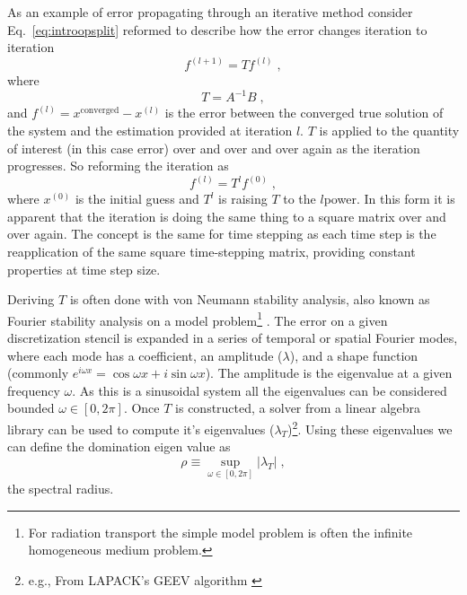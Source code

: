 As an example of error propagating through an iterative method consider Eq.~\eqref{eq:introopsplit} reformed to describe how the error changes iteration to iteration
\begin{equation}
    f^{(l+1)} = {T}f^{(l)} \; ,
\end{equation}
where
\begin{equation}
    {T} =   A^{-1}B \;,  %
\end{equation}
and $f^{(l)} = x^{\text{converged}} - x^{(l)}$ is the error between the converged true solution of the system and the estimation provided at iteration $l$.
${T}$ is applied to the quantity of interest (in this case error) over and over and over again as the iteration progresses.
So reforming the iteration as
\begin{equation}
    f^{(l)} = {T}^{l}f^{(0)} \; ,
\end{equation}
where $x^{(0)}$ is the initial guess and ${T}^{l}$ is raising ${T}$ to the $l$\ths power.
In this form it is apparent that the iteration is doing the same thing to a square matrix over and over again.
The concept is the same for time stepping as each time step is the reapplication of the same square time-stepping matrix, providing constant properties at time step size.

Deriving $T$ is often done with von Neumann stability analysis, also known as Fourier stability analysis on a model problem\footnote{For radiation transport the simple model problem is often the infinite homogeneous medium problem.} \cite{leveque2007finite}.
The error on a given discretization stencil is expanded in a series of temporal or spatial Fourier modes, where each mode has a coefficient, an amplitude ($\lambda$), and a shape function (commonly $e^{i\omega x}=\cos{\omega x} + i\sin{\omega x}$).
The amplitude is the eigenvalue at a given frequency $\omega$.
As this is a sinusoidal system all the eigenvalues can be considered bounded $\omega \in [0, 2\pi]$.
Once $T$ is constructed, a solver from a linear algebra library can be used to compute it's eigenvalues ($\lambda_T$)\footnote{e.g., From LAPACK's GEEV algorithm \cite{laug}}.
Using these eigenvalues we can define the domination eigen value as
\begin{equation}
    \rho \equiv \sup_{\omega\in[0,2\pi]}\left|\lambda_T\right| \; ,
\end{equation}
the spectral radius.


